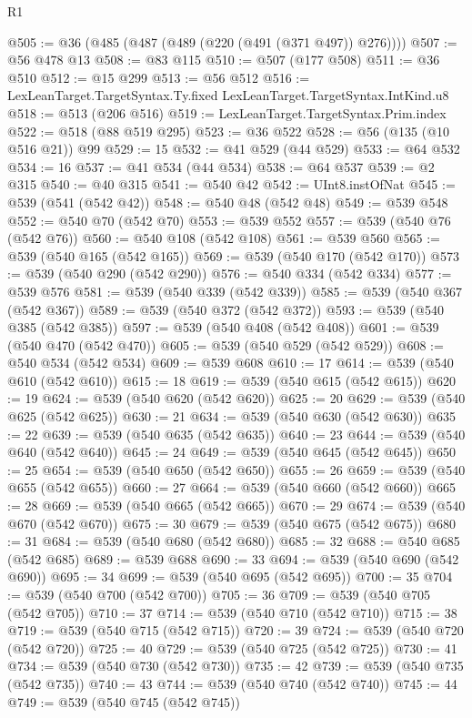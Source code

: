 \begin{lexlean}{R1}
\begin{coremodule}
@505 := @36 (@485 (@487 (@489 (@220 (@491 (@371 @497)) @276))))
@507 := @56 @478 @13
@508 := @83 @115
@510 := @507 (@177 @508)
@511 := @36 @510
@512 := @15 @299
@513 := @56 @512
@516 := LexLeanTarget.TargetSyntax.Ty.fixed LexLeanTarget.TargetSyntax.IntKind.u8
@518 := @513 (@206 @516)
@519 := LexLeanTarget.TargetSyntax.Prim.index
@522 := @518 (@88 @519 @295)
@523 := @36 @522
@528 := @56 (@135 (@10 @516 @21)) @99
@529 := 15
@532 := @41 @529 (@44 @529)
@533 := @64 @532
@534 := 16
@537 := @41 @534 (@44 @534)
@538 := @64 @537
@539 := @2 @315
@540 := @40 @315
@541 := @540 @42
@542 := UInt8.instOfNat
@545 := @539 (@541 (@542 @42))
@548 := @540 @48 (@542 @48)
@549 := @539 @548
@552 := @540 @70 (@542 @70)
@553 := @539 @552
@557 := @539 (@540 @76 (@542 @76))
@560 := @540 @108 (@542 @108)
@561 := @539 @560
@565 := @539 (@540 @165 (@542 @165))
@569 := @539 (@540 @170 (@542 @170))
@573 := @539 (@540 @290 (@542 @290))
@576 := @540 @334 (@542 @334)
@577 := @539 @576
@581 := @539 (@540 @339 (@542 @339))
@585 := @539 (@540 @367 (@542 @367))
@589 := @539 (@540 @372 (@542 @372))
@593 := @539 (@540 @385 (@542 @385))
@597 := @539 (@540 @408 (@542 @408))
@601 := @539 (@540 @470 (@542 @470))
@605 := @539 (@540 @529 (@542 @529))
@608 := @540 @534 (@542 @534)
@609 := @539 @608
@610 := 17
@614 := @539 (@540 @610 (@542 @610))
@615 := 18
@619 := @539 (@540 @615 (@542 @615))
@620 := 19
@624 := @539 (@540 @620 (@542 @620))
@625 := 20
@629 := @539 (@540 @625 (@542 @625))
@630 := 21
@634 := @539 (@540 @630 (@542 @630))
@635 := 22
@639 := @539 (@540 @635 (@542 @635))
@640 := 23
@644 := @539 (@540 @640 (@542 @640))
@645 := 24
@649 := @539 (@540 @645 (@542 @645))
@650 := 25
@654 := @539 (@540 @650 (@542 @650))
@655 := 26
@659 := @539 (@540 @655 (@542 @655))
@660 := 27
@664 := @539 (@540 @660 (@542 @660))
@665 := 28
@669 := @539 (@540 @665 (@542 @665))
@670 := 29
@674 := @539 (@540 @670 (@542 @670))
@675 := 30
@679 := @539 (@540 @675 (@542 @675))
@680 := 31
@684 := @539 (@540 @680 (@542 @680))
@685 := 32
@688 := @540 @685 (@542 @685)
@689 := @539 @688
@690 := 33
@694 := @539 (@540 @690 (@542 @690))
@695 := 34
@699 := @539 (@540 @695 (@542 @695))
@700 := 35
@704 := @539 (@540 @700 (@542 @700))
@705 := 36
@709 := @539 (@540 @705 (@542 @705))
@710 := 37
@714 := @539 (@540 @710 (@542 @710))
@715 := 38
@719 := @539 (@540 @715 (@542 @715))
@720 := 39
@724 := @539 (@540 @720 (@542 @720))
@725 := 40
@729 := @539 (@540 @725 (@542 @725))
@730 := 41
@734 := @539 (@540 @730 (@542 @730))
@735 := 42
@739 := @539 (@540 @735 (@542 @735))
@740 := 43
@744 := @539 (@540 @740 (@542 @740))
@745 := 44
@749 := @539 (@540 @745 (@542 @745))

\end{coremodule}
\end{lexlean}
